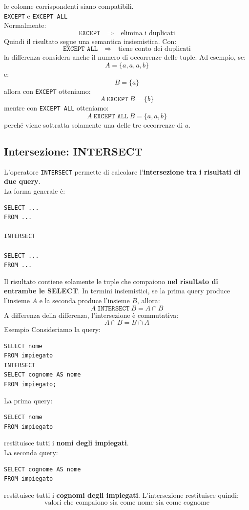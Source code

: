 le colonne corrispondenti siano compatibili.\\
\texttt{EXCEPT} e \texttt{EXCEPT ALL}\\
Normalmente:
\[
\boxed{\texttt{EXCEPT} \quad \Rightarrow \quad
\text{elimina i duplicati}}
\]
Quindi il risultato segue una semantica insiemistica.
Con:
\[
\boxed{\texttt{EXCEPT ALL} \quad \Rightarrow \quad
\text{tiene conto dei duplicati}}
\]
la differenza considera anche il numero di occorrenze delle tuple.
Ad esempio, se:
\[
A = \{a,a,a,b\}
\]
e:
\[
B = \{a\}
\]
allora con \texttt{EXCEPT} otteniamo:
\[
A \ \texttt{EXCEPT} \ B = \{b\}
\]
mentre con \texttt{EXCEPT ALL} otteniamo:
\[
A \ \texttt{EXCEPT ALL} \ B = \{a,a,b\}
\]
perché viene sottratta solamente una delle tre occorrenze di $a$.

\subsection{Intersezione: INTERSECT}
L'operatore \texttt{INTERSECT} permette di calcolare
l'\textbf{intersezione tra i risultati di due query}.\\
La forma generale è:
\begin{verbatim}
SELECT ...
FROM ...

INTERSECT

SELECT ...
FROM ...
\end{verbatim}
\noindent Il risultato contiene solamente le tuple che compaiono
\textbf{nel risultato di entrambe le SELECT}.
In termini insiemistici, se la prima query produce l'insieme $A$
e la seconda produce l'insieme $B$, allora:
\[
A \ \texttt{INTERSECT} \ B = A \cap B
\]
A differenza della differenza, l'intersezione è commutativa:
\[
A \cap B = B \cap A
\]
\textcolor{verdeEsempio}{Esempio} 
Consideriamo la query:
\begin{verbatim}
SELECT nome
FROM impiegato
INTERSECT
SELECT cognome AS nome
FROM impiegato;
\end{verbatim}
\noindent La prima query:
\begin{verbatim}
SELECT nome
FROM impiegato
\end{verbatim}
\noindent restituisce tutti i \textbf{nomi degli impiegati}.\\
La seconda query:
\begin{verbatim}
SELECT cognome AS nome
FROM impiegato
\end{verbatim}
\noindent restituisce tutti i \textbf{cognomi degli impiegati}.
L'intersezione restituisce quindi:
\[
\boxed{
\text{valori che compaiono sia come nome sia come cognome}
}
\]
